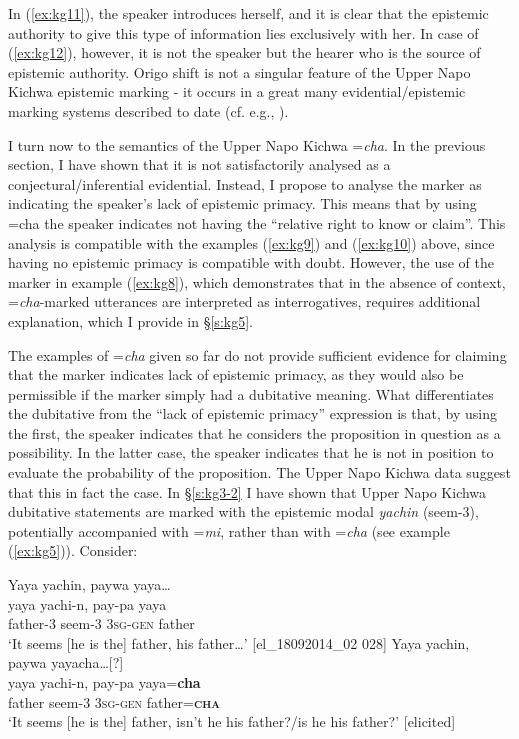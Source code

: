 \documentclass[output=paper]{langscibook}
\begin{document}
In (\ref{ex:kg11}), the speaker introduces herself, and it is clear that the epistemic authority to give this type of information lies exclusively with her. In case of (\ref{ex:kg12}), however, it is not the speaker but the hearer who is the source of epistemic authority. Origo shift is not a singular feature of the Upper Napo Kichwa epistemic marking - it occurs in a great many evidential/epistemic marking systems described to date (cf. e.g., \citealt{Hargreaves2005}).

I turn now to the semantics of the Upper Napo Kichwa =\textit{cha}. In the previous section, I have shown that it is not satisfactorily analysed as a conjectural/inferential evidential. Instead, I propose to analyse the marker as indicating the speaker’s lack of epistemic primacy. This means that by using =cha the speaker indicates not having the “relative right to know or claim”. This analysis is compatible with the examples ‎(\ref{ex:kg9}) and (\ref{ex:kg10}) above, since having no epistemic primacy is compatible with doubt. However, the use of the marker in example ‎(\ref{ex:kg8}), which demonstrates that in the absence of context, =\textit{cha}-marked utterances are interpreted as interrogatives, requires additional explanation, which I provide in §‎\ref{s:kg5}.

The examples of =\textit{cha} given so far do not provide sufficient evidence for claiming that the marker indicates lack of epistemic primacy, as they would also be permissible if the marker simply had a dubitative meaning. What differentiates the dubitative from the “lack of epistemic primacy” expression is that, by using the first, the speaker indicates that he considers the proposition in question as a possibility. In the latter case, the speaker indicates that he is not in position to evaluate the probability of the proposition. The Upper Napo Kichwa data suggest that this in fact the case. In §\ref{s:kg3-2}  I have shown that Upper Napo Kichwa dubitative statements are marked with the epistemic modal \textit{yachin} (seem-3), potentially accompanied with =\textit{mi}, rather than with =\textit{cha} (see example ‎(\ref{ex:kg5})). Consider:

\begin{exe}
	\ex \label{ex:kg13}
	\begin{xlist}
		\ex \label{ex:kg13a}
		\glll Yaya yachin, paywa yaya…\\
		 yaya yachi-n, pay-pa yaya\\
		father-3 seem-3 3\textsc{sg}-\textsc{gen} father\\
		\trans ‘It seems [he is the] father, his father…’ [el\_18092014\_02 028]
		\ex  \label{ex:kg13b}
		\glll Yaya yachin, paywa yayacha…[?]\\
		yaya yachi-n, pay-pa yaya=\textbf{cha}\\
        father seem-3 3\textsc{sg}-\textsc{gen} father=\textbf{\textsc{cha}}\\
        \trans ‘It seems [he is the] father, isn’t he his father?/is he his father?’ [elicited]
	\end{xlist}
\end{exe}
\end{document}
